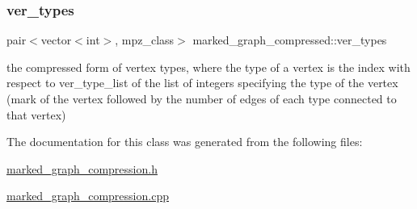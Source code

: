 \mbox{\label{classmarked__graph__compressed_af446cc5e23c241a92b76642fd5ebc403}} 
\subsubsection{\texorpdfstring{ver\+\_\+types}{ver\_types}}
{\footnotesize\ttfamily pair$<$vector$<$int$>$, mpz\+\_\+class$>$ marked\+\_\+graph\+\_\+compressed\+::ver\+\_\+types}



the compressed form of vertex types, where the type of a vertex is the index with respect to ver\+\_\+type\+\_\+list of the list of integers specifying the type of the vertex (mark of the vertex followed by the number of edges of each type connected to that vertex) 



The documentation for this class was generated from the following files\+:\begin{DoxyCompactItemize}
\item 
\hyperlink{marked__graph__compression_8h}{marked\+\_\+graph\+\_\+compression.\+h}\item 
\hyperlink{marked__graph__compression_8cpp}{marked\+\_\+graph\+\_\+compression.\+cpp}\end{DoxyCompactItemize}
